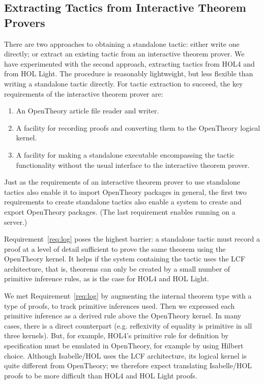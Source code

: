 \documentclass{llncs}
\newcommand{\OpenTheory}{OpenTheory\xspace}
\newcommand{\eg}{e.g.\xspace}
\begin{document}
\subsection{Extracting Tactics from Interactive Theorem Provers}

There are two approaches to obtaining a standalone tactic: either write one directly; or extract an existing tactic from an interactive theorem prover.
We have experimented with the second approach, extracting tactics from HOL4 and from HOL Light.
The procedure is reasonably lightweight, but less flexible than writing a standalone tactic directly.
For tactic extraction to succeed, the key requirements of the interactive theorem prover are:
\begin{enumerate}
\item\label{req:io} An \OpenTheory article file reader and writer.

\item\label{req:log} A facility for recording proofs and converting them to the \OpenTheory logical kernel.

\item\label{req:ckpt} A facility for making a standalone executable encompassing the tactic functionality without the usual interface to the interactive theorem prover.
\end{enumerate}

Just as the requirements of an interactive theorem prover to use standalone tactics also enable it to import \OpenTheory packages in general, the first two requirements to create standalone tactics also enable a system to create and export \OpenTheory packages.
(The last requirement enables running on a server.)

Requirement~\ref{req:log} poses the highest barrier: a standalone tactic must record a proof at a level of detail sufficient to prove the same theorem using the \OpenTheory kernel.
It helps if the system containing the tactic uses the LCF architecture, that is, theorems can only be created by a small number of primitive inference rules, as is the case for HOL4 and HOL Light.

We met Requirement~\ref{req:log} by augmenting the internal theorem type with a type of proofs, to track primitive inferences used.
Then we expressed each primitive inference as a derived rule above the \OpenTheory kernel.
In many cases, there is a direct counterpart (\eg reflexivity of equality is primitive in all three kernels).
But, for example, HOL4's primitive rule for definition by specification must be emulated in \OpenTheory, for example by using Hilbert choice.
Although Isabelle/HOL uses the LCF architecture, its logical kernel is quite different from \OpenTheory; we therefore expect translating Isabelle/HOL proofs to be more difficult than HOL4 and HOL Light proofs.
\end{document}
